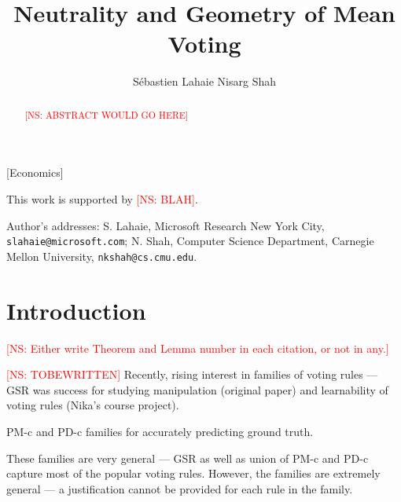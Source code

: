 \documentclass[prodmode,acmec]{ec-acmsmall}
\newcommand{\kibitz}[2]{\ifnum\Comments=1\textcolor{#1}{#2}\fi}
\newcommand{\ns}[1]{\kibitz{red} {[NS: #1]}}
\begin{document}

\title{Neutrality and Geometry of Mean Voting}
\author{S\'{e}bastien Lahaie
Nisarg Shah
}

\begin{abstract}
\ns{ABSTRACT WOULD GO HERE}
\end{abstract}

[Economics]




\begin{bottomstuff}
This work is supported by \ns{BLAH}.

Author's addresses: S. Lahaie, Microsoft Research New York City, {\small\tt slahaie@microsoft.com}; N. Shah, Computer Science Department, Carnegie Mellon University, {\small\tt nkshah@cs.cmu.edu}.
\end{bottomstuff}

\maketitle

\section{Introduction}
\label{sec:intro}
\ns{Either write Theorem and Lemma number in each citation, or not in any.}

\ns{TOBEWRITTEN}
Recently, rising interest in families of voting rules --- GSR was success for studying manipulation (original paper) and learnability of voting rules (Nika's course project). 

PM-c and PD-c families for accurately predicting ground truth.

These families are very general --- GSR as well as union of PM-c and PD-c capture most of the popular voting rules. However, the families are extremely general --- a justification cannot be provided for each rule in the family. 
\end{document}
